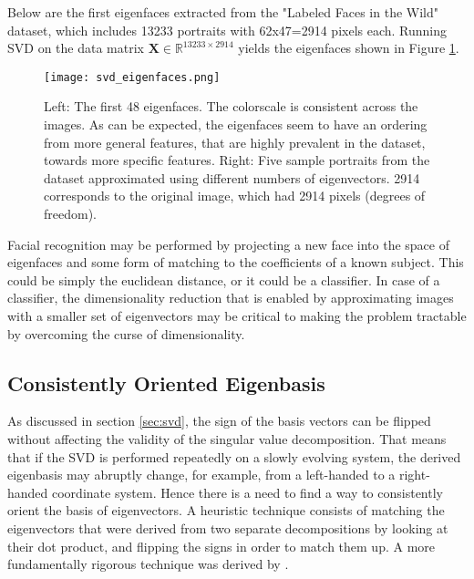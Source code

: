 Below are the first eigenfaces extracted from the "Labeled Faces in the Wild" dataset, which includes 13233 portraits with 62x47=2914 pixels each. Running SVD on the data matrix $\mathbf{X} \in \mathbb{R}^{13233\times 2914}$ yields the eigenfaces shown in Figure \ref{fig:svd_eigenfaces}.

\begin{figure}
\centering
    \texttt{[image: svd\_eigenfaces.png]}
    \caption{Left: The first 48 eigenfaces. The colorscale is consistent across the images. As can be expected, the eigenfaces seem to have an ordering from more general features, that are highly prevalent in the dataset, towards more specific features. Right: Five sample portraits from the dataset approximated using different numbers of eigenvectors. 2914 corresponds to the original image, which had 2914 pixels (degrees of freedom).}
    \label{fig:svd_eigenfaces}
\end{figure}

Facial recognition may be performed by projecting a new face into the space of eigenfaces and some form of matching to the coefficients of a known subject. This could be simply the euclidean distance, or it could be a classifier. In case of a classifier, the dimensionality reduction that is enabled by approximating images with a smaller set of eigenvectors may be critical to making the problem tractable by overcoming the curse of dimensionality.


\subsection{Consistently Oriented Eigenbasis}
	
As discussed in section \ref{sec:svd}, the sign of the basis vectors can be flipped without affecting the validity of the singular value decomposition. That means that if the SVD is performed repeatedly on a slowly evolving system, the derived eigenbasis may abruptly change, for example, from a left-handed to a right-handed coordinate system. Hence there is a need to find a way to consistently orient the basis of eigenvectors. A heuristic technique consists of matching the eigenvectors that were derived from two separate decompositions by looking at their dot product, and flipping the signs in order to match them up. A more fundamentally rigorous technique was derived by . 

